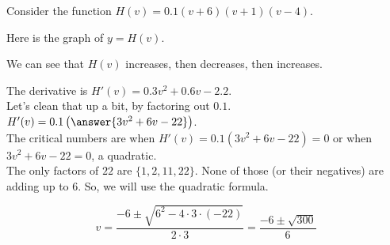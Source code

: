 \documentclass{ximera}
\begin{document}
\begin{example}

Consider the function $H(v) = 0.1(v+6)(v+1)(v-4)$.

Here is the graph of $y = H(v)$.








\begin{image}
\end{image}




We can see that $H(v)$ increases, then decreases, then increases.  


The derivative is $H'(v) = 0.3 v^2 + 0.6 v - 2.2$. \\

Let's clean that up a bit, by factoring out $0.1$. $H'(v) = 0.1 \left( \answer{3 v^2 + 6 v - 22} \right)$. \\



The critical numbers are when $H'(v) = 0.1(3 v^2 + 6 v - 22) =0$ or when $3 v^2 + 6 v - 22 =0$,   a quadratic. \\


The only factors of $22$ are $\{ 1, 2, 11, 22    \}$.  None of those (or their negatives) are adding up to $6$.  So, we will use the quadratic formula.



\[  v = \frac{-6 \pm \sqrt{6^2 - 4 \cdot 3 \cdot (-22)}}{2 \cdot 3}  = \frac{-6 \pm \sqrt{300}}{6}    \]



\end{example}
\end{document}
